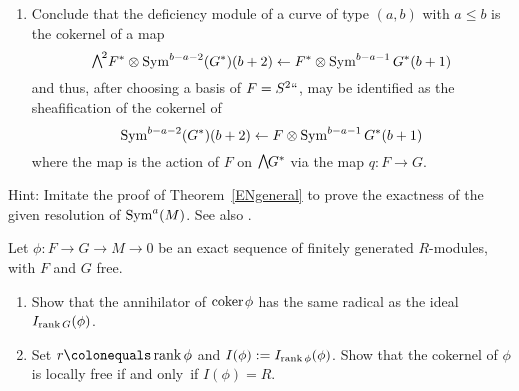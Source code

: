 \begin{exercise}
\begin{enumerate}
\item Conclude that the deficiency module of a curve of type $(a, b)$
with $a\leq b$ is the cokernel of a map
$$
\mwedge^2 F^* \otimes \Sym^{b-a-2} (G^*)(b+2) \lTo F^*\otimes \Sym^{b-a-1}
G^*(b+1)
$$
and thus, after choosing a basis of $F = S^2` `$, may be identified as
the sheafification of the cokernel of
$$
\operatorname{Sym}^{b-a-2} (G^*)(b+2) \leftarrow F\otimes \operatorname{Sym}^{b-a-1} G^*(b+1)
$$
where the map is the action of $F$ on $\mwedge G^*$ via the map $q:F\to G$.
\end{enumerate}

Hint:  Imitate the proof of Theorem~\ref{ENgeneral} to prove
the exactness of the given resolution of $\operatorname{Sym}^a(M)$. See also
\cite[Appendix A2.6]{Eisenbud1995}.
\end{exercise}

\begin{exercise}
\label{Fitt}
Let $\phi: F\to G \to M\to 0$ be an exact sequence of finitely generated
$R$-modules,
with $F$ and $G$ free.

\begin{enumerate}
\item Show that the annihilator of  ${\rm{coker}\kern1pt} \phi$ has the
same radical as the ideal $I_{\operatorname{rank} G}(\phi)$.
\item Set $r\colonequals  \rank \phi$ and  
$I(\phi): =I_{\operatorname{rank} \phi}(\phi)$. Show that the cokernel of $\phi$
is locally free if and only~if $I(\phi) = R$.
\end{enumerate}
\end{exercise}


